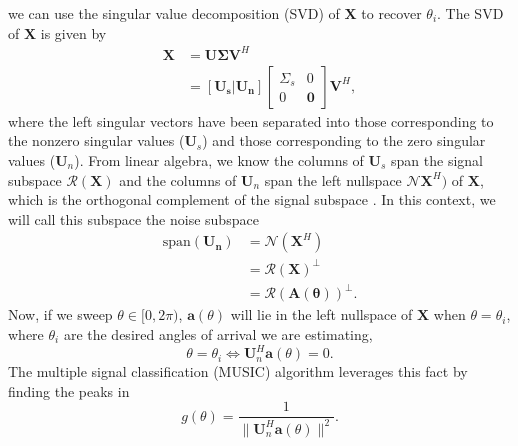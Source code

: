 we can use the singular value decomposition (SVD) of $\bm{X}$ to recover
$\theta_i$. The SVD of $\bm{X}$ is given by
\begin{align}
	\bm{X} &= \bm{U} \bm{\Sigma} \bm{V}^H\\
	&= [\bm{U_s} | \bm{U_n}] \begin{bmatrix} \Sigma_s & 0 \\
	0 & \bm{0} \end{bmatrix} \bm{V}^H,
\end{align}
where the left singular vectors have been separated into those corresponding
to the nonzero singular values ($\bm{U}_s$) and those corresponding to the
zero singular values ($\bm{U}_n$). From linear algebra, we know the columns of
$\bm{U}_s$ span the signal subspace $\mathcal{R}(\bm{X})$ and the columns of
$\bm{U}_n$ span the left nullspace $\mathcal{N}{\bm{X}^H})$ of $\bm{X}$, which
is the orthogonal complement of the signal subspace \cite{meyer2000matrix}. In this context, we will
call this subspace the noise subspace
\begin{align}
	\text{span}(\bm{U_n}) &= \mathcal{N}(\bm{X}^H) \\
	&= \mathcal{R}(\bm{X})^\perp\\
	&= \mathcal{R}(\bm{A}(\bm{\theta}))^\perp.
\end{align}
Now, if we sweep $\theta \in [0, 2\pi)$, $\bm{a}(\theta)$ will lie in the left
nullspace of $\bm{X}$ when $\theta=\theta_i$, where $\theta_i$ are the desired
angles of arrival we are estimating, 
\begin{equation}
	\theta = \theta_i \iff \bm{U}_n^H \bm{a}(\theta) = 0.
\end{equation}
The multiple signal classification (MUSIC)
algorithm leverages this fact by finding the peaks in \cite{schmidt1986multiple}
\begin{equation}
	g(\theta) = \frac{1}{\|\bm{U}_n^H \bm{a}(\theta)\|^2}.
\end{equation}

